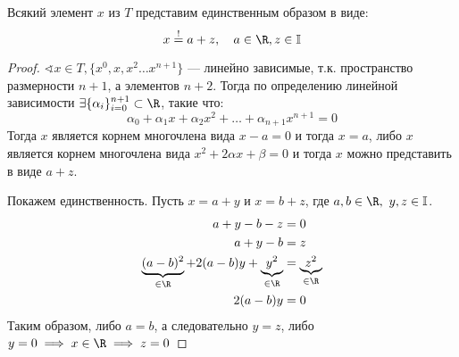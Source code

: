 \begin{lemma}
	Всякий элемент \(x\) из \(T\) представим единственным образом в виде:
	\[x \stackrel{!}{=} a + z, \quad a \in \R, z \in \mathbb{I}\]
\end{lemma}
\begin{proof}
	\(\sphericalangle x \in T, \{x^0, x, x^2 \dots x^{n+1}\}\) --- линейно зависимые, т.к. пространство размерности \(n + 1\), а элементов \(n + 2\). Тогда по определению линейной зависимости \(\exists \{\alpha_i\}_{i=0}^{n+1} \subset \R\), такие что:
	\[\alpha_0 + \alpha_1 x + \alpha_2 x^2 + \dots + \alpha_{n+1} x^{n+1} = 0\]
	Тогда \(x\) является корнем многочлена вида \(x-a=0\) и тогда \(x=a\), либо \(x\) является корнем многочлена вида \(x^2 + 2 \alpha x + \beta = 0\) и тогда \(x\) можно представить в виде \(a + z\).

	Покажем единственность.
	Пусть \(x = a + y\) и \(x = b + z\), где \(a, b \in \R,\ y, z \in \mathbb{I}\).
	\begin{align*}
		a + y - b - z                                                            & = 0                         \\
		a + y - b                                                                & = z                         \\
		\underbrace{(a - b)^2}_{\in \R} + 2 (a - b)y + \underbrace{y^2}_{\in \R} & = \underbrace{z^2}_{\in \R} \\
		2(a-b) y                                                                 & = 0
	\end{align*}
	Таким образом, либо \(a = b\), а следовательно \(y = z\), либо \(y = 0 \implies x \in \R \implies z = 0\)
\end{proof}

